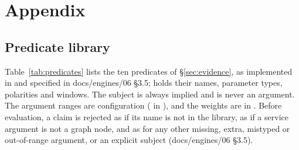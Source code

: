 \section{Appendix}
\label{sec:appendix}

\subsection{Predicate library}
\label{sec:app-predicates}

Table~\ref{tab:predicates} lists the ten predicates of \S\ref{sec:evidence}, as implemented in  and specified in docs/engines/06 §3.5;  holds their names, parameter types, polarities and windows.
The subject is always implied and is never an argument.
The argument ranges are configuration ( in ), and the weights are  in .
Before evaluation, a claim is rejected as  if its name is not in the library, as  if a service argument is not a graph node, and as  for any other missing, extra, mistyped or out-of-range argument, or an explicit subject (docs/engines/06 §3.5).

